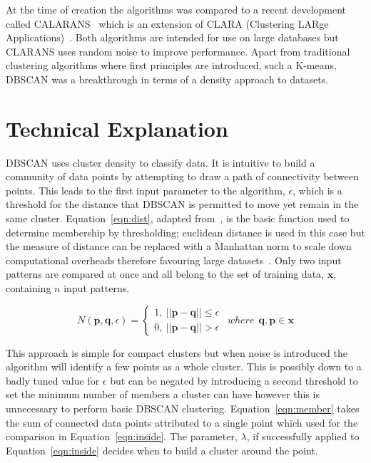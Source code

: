 \documentclass{ecsarticle}     %
\begin{document}
At the time of creation the algorithms was compared to a recent development called CALARANS~\citep{ng94clarans} which is an extension of CLARA (Clustering LARge Applications)~\citep{kaufman90clara}.
Both algorithms are intended for use on large databases but CLARANS uses random noise to improve performance.
Apart from traditional clustering algorithms where first principles are introduced, such a K-means, DBSCAN was a breakthrough in terms of a density approach to datasets.

\section{Technical Explanation}

DBSCAN uses cluster density to classify data.
It is intuitive to build a community of data points by attempting to draw a path of connectivity between points.
This leads to the first input parameter to the algorithm, $\epsilon$, which is a threshold for the distance that DBSCAN is permitted to move yet remain in the same cluster.
Equation~\eqref{eqn:dist}, adapted from~\cite{ester96dbscan}, is the basic function used to determine membership by thresholding; euclidean distance is used in this case but the measure of distance can be replaced with a Manhattan norm to scale down computational overheads therefore favouring large datasets~\citep{krause86taxicab}.
Only two input patterns are compared at once and all belong to the set of training data, $\textbf{x}$, containing $n$ input patterns.

\begin{equation}
	N(\textbf{p},\textbf{q},\epsilon) = \left\{
		\begin{array}{l}
    		1,\: ||\textbf{p} - \textbf{q}|| \leq \epsilon\\
    		0,\: ||\textbf{p} - \textbf{q}|| > \epsilon
  		\end{array} \right.
	\:\:where\:\: \textbf{q},\textbf{p} \in \textbf{x}
	\label{eqn:dist}
\end{equation}


This approach is simple for compact clusters but when noise is introduced the algorithm will identify a few points as a whole cluster.
This is possibly down to a badly tuned value for $\epsilon$ but can be negated by introducing a second threshold to set the minimum number of members a cluster can have however this is unnecessary to perform basic DBSCAN clustering.
Equation~\eqref{eqn:member} takes the sum of connected data points attributed to a single point which used for the comparison in Equation~\eqref{eqn:inside}. 
The parameter, $\lambda$, if successfully applied to Equation~\eqref{eqn:inside} decides when to build a cluster around the point.
\end{document}
